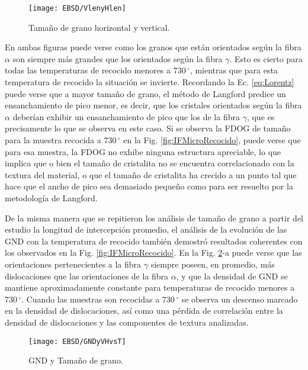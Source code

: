 \begin{figure}[!htb]
  \centering
  \texttt{[image: EBSD/VlenyHlen]}
  \caption{Tamaño de grano horizontal y vertical.}
  \label{fig:VlyHl}
\end{figure}

En ambas figuras puede verse como los granos que están orientados según la fibra $\alpha$ son siempre más grandes que los orientados según la fibra $\gamma$.
Esto es cierto para todas las temperaturas de recocido menores a 730\,$^{\circ}$, mientras que para esta temperatura de recocido la situación se invierte.
Recordando la Ec. \ref{eq:Lorentz} puede verse que a mayor tamaño de grano, el método de Langford predice un ensanchamiento de pico menor, es decir, que los cristales orientados según la fibra $\alpha$ deberían exhibir un ensanchamiento de pico que los de la fibra $\gamma$, que es precisamente lo que se observa en este caso.
Si se observa la FDOG de tamaño para la muestra recocida a 730\,$^{\circ}$ en la Fig. \ref{fig:IFMicroRecocido}, puede verse que para esa muestra, la FDOG no exhibe ninguna estructura apreciable, lo que implica que o bien el tamaño de cristalita no se encuentra correlacionado con la textura del material, o que el tamaño de cristalita ha crecido a un punto tal que hace que el ancho de pico sea demasiado pequeño como para ser resuelto por la metodología de Langford.

De la misma manera que se repitieron los análisis de tamaño de grano a partir del estudio la longitud de intercepción promedio, el análisis de la evolución de las GND con la temperatura de recocido también demostró resultados coherentes con los observados en la Fig. \ref{fig:IFMicroRecocido}.
En la Fig. \ref{fig:GNDyVH}-a puede verse que las orientaciones pertenecientes a la fibra $\gamma$ siempre poseen, en promedio, más dislocaciones que las orientaciones de la fibra $\alpha$, y que la densidad de GND se mantiene aproximadamente constante para temperaturas de recocido menores a 730\,$^{\circ}$.
Cuando las muestras son recocidas a 730\,$^{\circ}$ se observa un descenso marcado en la densidad de dislocaciones, así como una pérdida de correlación entre la densidad de dislocaciones y las componentes de textura analizadas.

\begin{figure}[!htb]
  \centering
  \texttt{[image: EBSD/GNDyVHvsT]}
  \caption{GND y Tamaño de grano.}
  \label{fig:GNDyVH}
\end{figure}

